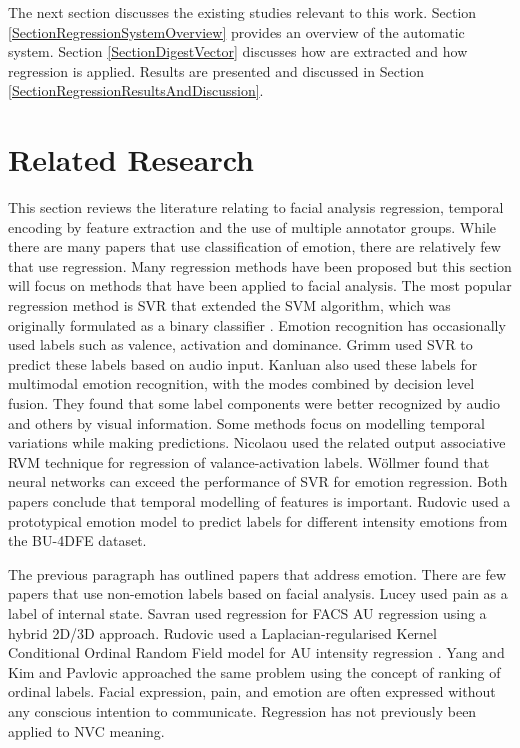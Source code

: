 The next section discusses the existing studies relevant to this work. Section \ref{SectionRegressionSystemOverview} provides an overview of the automatic system. Section \ref{SectionDigestVector} discusses how \temporalFeatSingle{ }are extracted and how regression is applied. Results are presented and discussed in Section \ref{SectionRegressionResultsAndDiscussion}.

\section{Related Research}
\label{BackgroundSupervisedRegression}

This section reviews the literature relating to facial analysis regression, temporal encoding by feature extraction and the use of multiple annotator groups. While there are many papers that use classification of emotion, there are relatively few that use regression. Many regression methods have been proposed but this section will focus on methods that have been applied to facial analysis. The most popular regression method is \ac{SVR} \cite{Drucker1997} that extended the \ac{SVM} algorithm, which was originally formulated as a binary classifier \cite{Vapnik1998}. 
Emotion recognition has occasionally used \continuous labels such as valence, activation and dominance. Grimm \etal \cite{Grimm2007} used \ac{SVR} to predict these labels based on audio input. Kanluan \etal \cite{Kanluan2008} also used these labels for multimodal emotion recognition, with the modes combined by decision level fusion. They found that some label components were better recognized by audio and others by visual information. Some methods focus on modelling temporal variations while making \continuous predictions. Nicolaou \etal \cite{Nicolaou2011} used the related output associative \ac{RVM} technique for regression of valance-activation labels. W\"{o}llmer \etal \cite{Wollmer2008} found that neural networks can exceed the performance of \ac{SVR} for emotion regression. Both papers conclude that temporal modelling of features is important. Rudovic \etal \cite{Rudovic2012cvpr} used a prototypical emotion model to predict labels for different intensity emotions from the BU-4DFE dataset.

The previous paragraph has outlined papers that address emotion. There are few papers that use non-emotion labels based on facial analysis. Lucey \etal \cite{Lucey2009} used pain as a \continuous label of internal state. Savran \etal \cite{Savran2012} used regression for \ac{FACS} \ac{AU} regression using a hybrid {2D}/{3D} approach. Rudovic \etal used a  Laplacian-regularised Kernel Conditional Ordinal Random Field model for \ac{AU} intensity regression \cite{Rudovic2012}. Yang \etal \cite{Yang2009c} and Kim and Pavlovic \cite{Kim2010} approached the same problem using the concept of ranking of ordinal labels. Facial expression, pain, and emotion are often expressed without any conscious intention to communicate. Regression has not previously been applied to \ac{NVC} meaning.


